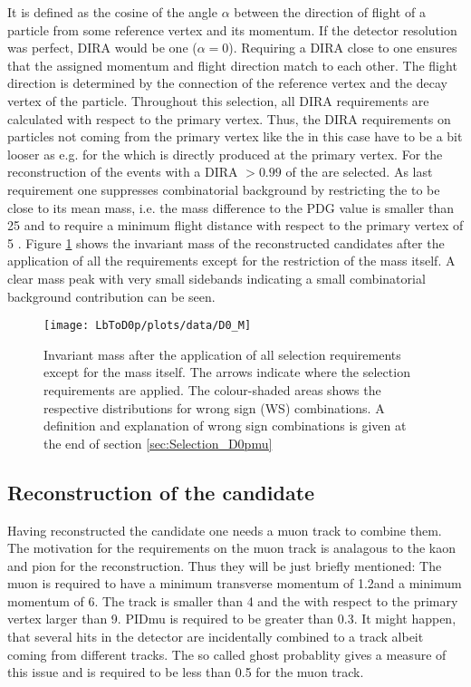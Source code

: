 It is defined as the cosine of the angle $\alpha$ between the direction of flight of a particle from some reference vertex and its momentum.
If the detector resolution was perfect, DIRA would be one ($\alpha = 0$).
Requiring a DIRA close to one ensures that the assigned momentum and flight direction match to each other.
The flight direction is determined by the connection of the reference vertex and the decay vertex of the particle.
Throughout this selection, all DIRA requirements are calculated with respect to the primary vertex.
Thus, the DIRA requirements on particles not coming from the primary vertex like the \Dz in this case have to be a bit looser as e.g. for the \Lb which is directly produced at the primary vertex.
For the reconstruction of the \Dz events with a DIRA $>0.99$ of the \Dz are selected.
As last requirement one suppresses combinatorial background by restricting the \Dz to be close to its mean mass, i.e. the mass difference to the PDG value is smaller than 25 \mev and to require a minimum \Dz flight distance with respect to the primary vertex of 5 \mm.
Figure \ref{fig:plot_mD0} shows the invariant mass of the reconstructed \Dz candidates after the application of all the requirements except for the restriction of the \Dz mass itself.
A clear mass peak with very small sidebands indicating a small combinatorial background contribution can be seen.
\begin{figure}[tb]
	\centering
	\texttt{[image: LbToD0p/plots/data/D0\_M]}
	\caption{Invariant \Dz mass after the application of all selection requirements except for the \Dz mass itself.
             The arrows indicate where the selection requirements are applied.
             The colour-shaded areas shows the respective distributions for wrong sign (WS) combinations.
             A definition and explanation of wrong sign combinations is given at the end of section \ref{sec:Selection_D0pmu}}
	\label{fig:plot_mD0}
\end{figure}

\subsection{Reconstruction of the \Dz\mun candidate}
\label{sec:Selection_D0mu}
Having reconstructed the \Dz candidate one needs a muon track to combine them.
The motivation for the requirements on the muon track is analagous to the kaon and pion for the \Dz reconstruction.
Thus they will be just briefly mentioned:
The muon is required to have a minimum transverse momentum of 1.2\gev and a minimum momentum of 6\gev.
The track \chisqndf is smaller than 4 and the \chisqip with respect to the primary vertex larger than 9.
PIDmu is required to be greater than 0.3.
It might happen, that several hits in the detector are incidentally combined to a track albeit coming from different tracks.
The so called ghost probablity gives a measure of this issue and is required to be less than 0.5 for the muon track.

